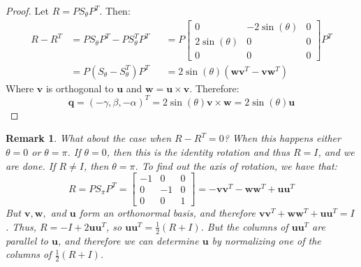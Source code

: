\documentclass{article}
\theoremstyle{mystyle}
\newtheorem{remark}{Remark}[section]
\begin{document}
\begin{proof}
Let $R = PS_{\theta}P^T$. Then:
\begin{align*}
    R-R^{T} &= PS_{\theta}P^{T} - PS_{\theta}^{T}P^{T} & &= P\begin{bmatrix}0 & -2\sin(\theta) & 0 \\ 2\sin(\theta) & 0 & 0 \\ 0 & 0 & 0 \end{bmatrix}P^{T}\\
    &= P(S_{\theta}-S_{\theta}^{T})P^{T} & &= 2\sin(\theta)(\mathbf{w}\mathbf{v}^{T} - \mathbf{v}\mathbf{w}^{T})
\end{align*} 
Where $\mathbf{v}$ is orthogonal to $\mathbf{u}$ and $\mathbf{w} = \mathbf{u}\times \mathbf{v}$. Therefore:
\begin{equation*}
    \mathbf{q} = (-\gamma, \beta, -\alpha)^{T} = 2\sin(\theta) \mathbf{v}\times \mathbf{w} = 2\sin(\theta) \mathbf{u}
\end{equation*}
\end{proof}
\begin{remark}
What about the case when $R-R^T = 0$? When this happens either $\theta = 0$ or $\theta = \pi$. If $\theta = 0$, then this is the identity rotation and thus $R = I$, and we are done. If $R\ne I$, then $\theta = \pi$. To find out the axis of rotation, we have that:
\begin{equation*}
    R = PS_{\pi}P^T = \begin{bmatrix}-1 & 0 & 0 \\ 0 & -1 & 0 \\ 0 & 0 & 1 \end{bmatrix} = -\mathbf{v}\mathbf{v}^T - \mathbf{w}\mathbf{w}^T +\mathbf{u}\mathbf{u}^T    
\end{equation*}
But $\mathbf{v},\mathbf{w},$ and $\mathbf{u}$ form an orthonormal basis, and therefore $\mathbf{v}\mathbf{v}^T + \mathbf{w}\mathbf{w}^T+\mathbf{u}\mathbf{u}^T = I$. Thus, $R = -I+2\mathbf{u}\mathbf{u}^T$, so $\mathbf{u} \mathbf{u}^T = \frac{1}{2}(R+I)$. But the columns of $\mathbf{u}\mathbf{u}^T$ are parallel to $\mathbf{u}$, and therefore we can determine $\mathbf{u}$ by normalizing one of the columns of $\frac{1}{2}(R+I)$.
\end{remark}
\end{document}
